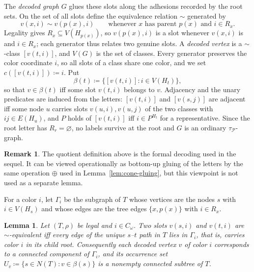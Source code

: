 \documentclass[11pt]{article}
\newtheorem{lemma}[theorem]{Lemma}
\theoremstyle{definition}
\newtheorem*{remark}{Remark}
\newcommand{\defeq}{\coloneqq}
\newcommand{\Pred}{\mathcal P}
\begin{document}
The \emph{decoded graph} \(G\) glues these slots along the adhesions recorded by
the root sets.  On the set of all slots define the equivalence relation \(\sim\)
generated by
\[
  v(x,i)\sim v(p(x),i)\qquad\text{whenever \(x\) has parent \(p(x)\) and
  \(i\in R_x\).}
\]
Legality gives \(R_x\subseteq V(H_{p(x)})\), so \(v(p(x),i)\) is a slot whenever
\(v(x,i)\) is and \(i\in R_x\); each generator thus relates two genuine slots.  A
\emph{decoded vertex} is a \(\sim\)-class \([v(t,i)]\), and \(V(G)\) is the set of
classes.  Every generator preserves the color coordinate \(i\), so all slots of a
class share one color, and we set \(c([v(t,i)])\defeq i\).  Put
\[
  \beta(t)\defeq\{[v(t,i)]:i\in V(H_t)\},
\]
so that \(v\in\beta(t)\) iff some slot \(v(t,i)\) belongs to \(v\).  Adjacency and
the unary predicates are induced from the letters: \([v(t,i)]\) and \([v(s,j)]\)
are adjacent iff some node \(u\) carries slots \(v(u,i),v(u,j)\) of the two classes
with \(ij\in E(H_u)\), and \(P\) holds of \([v(t,i)]\) iff \(i\in P^{H_t}\) for a
representative.  Since the root letter has \(R_r=\varnothing\), no labels survive
at the root and \(G\) is an ordinary \(\tau_{\Pred}\)-graph.

\begin{remark}
The quotient definition above is the formal decoding used in the sequel.  It can
be viewed operationally as bottom-up gluing of the letters by the same operation
\(\oplus\) used in Lemma~\ref{lem:cone-gluing}, but this viewpoint is not used as
a separate lemma.
\end{remark}

For a color \(i\), let \(\Gamma_i\) be the subgraph of \(T\) whose vertices are the
nodes \(s\) with \(i\in V(H_s)\) and whose edges are the tree edges \(\{x,p(x)\}\)
with \(i\in R_x\).

\begin{lemma}\label{lem:decode-occ}
Let \((T,\rho)\) be legal and \(i\in C_\omega\).  Two slots \(v(s,i)\) and
\(v(t,i)\) are \(\sim\)-equivalent iff every edge of the unique \(s\)--\(t\) path in
\(T\) lies in \(\Gamma_i\), that is, carries color \(i\) in its child root.
Consequently each decoded vertex \(v\) of color \(i\) corresponds to a connected
component of \(\Gamma_i\), and its occurrence set
\(U_v\defeq\{s\in N(T):v\in\beta(s)\}\) is a nonempty connected subtree of \(T\).
\end{lemma}
\end{document}
